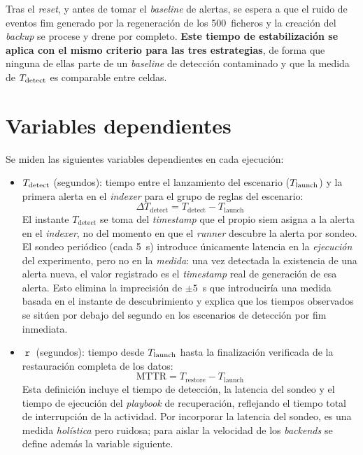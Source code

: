 \documentclass[../main.tex]{subfiles}
\begin{document}
Tras el \emph{reset}, y antes de tomar el \emph{baseline} de alertas, se espera a
que el ruido de eventos \gls{fim} generado por la regeneración de los 500~ficheros
y la creación del \emph{backup} se procese y drene por completo. \textbf{Este tiempo
de estabilización se aplica con el mismo criterio para las tres estrategias}, de
forma que ninguna de ellas parte de un \emph{baseline} de detección contaminado y
que la medida de $T_{\text{detect}}$ es comparable entre celdas.

\section{Variables dependientes}

Se miden las siguientes variables dependientes en cada ejecución:

\begin{itemize}
  \item $T_{\text{detect}}$ (segundos): tiempo entre el lanzamiento del escenario
  ($T_{\text{launch}}$) y la primera alerta en el \emph{indexer} para el grupo de reglas
  del escenario:
  \begin{equation}
    \Delta T_{\text{detect}} = T_{\text{detect}} - T_{\text{launch}}
  \end{equation}
  El instante $T_{\text{detect}}$ se toma del \emph{timestamp} que el propio
  \gls{siem} asigna a la alerta en el \emph{indexer}, no del momento en que el
  \emph{runner} descubre la alerta por sondeo. El sondeo periódico (cada 5~s)
  introduce únicamente latencia en la \emph{ejecución} del experimento, pero no en
  la \emph{medida}: una vez detectada la existencia de una alerta nueva, el valor
  registrado es el \emph{timestamp} real de generación de esa alerta. Esto elimina
  la imprecisión de $\pm 5$~s que introduciría una medida basada en el instante de
  descubrimiento y explica que los tiempos observados se sitúen por debajo del
  segundo en los escenarios de detección por \gls{fim} inmediata.

  \item $\mttr$ (segundos): tiempo desde $T_{\text{launch}}$ hasta la finalización
  verificada de la restauración completa de los datos:
  \begin{equation}
    \text{MTTR} = T_{\text{restore}} - T_{\text{launch}}
  \end{equation}
  Esta definición incluye el tiempo de detección, la latencia del sondeo y el
  tiempo de ejecución del \emph{playbook} de recuperación, reflejando el tiempo
  total de interrupción de la actividad. Por incorporar la latencia del sondeo, es
  una medida \emph{holística} pero ruidosa; para aislar la velocidad de los
  \emph{backends} se define además la variable siguiente.


\end{itemize}
\end{document}
